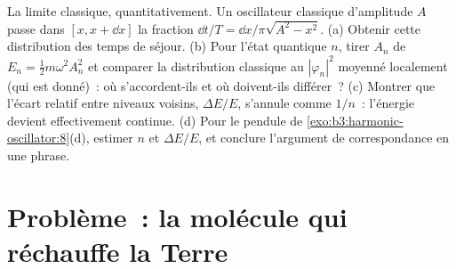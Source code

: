 \begin{exercise}[$\star\star\star$]\label{exo:b3:harmonic-oscillator:12}
La limite classique, quantitativement. Un oscillateur classique
d'amplitude $A$ passe dans $[x, x + \dd x]$ la fraction $\dd
t/T = \dd x/\pi\sqrt{A^2 - x^2}$. (a) Obtenir cette distribution des
temps de séjour. (b) Pour l'état quantique $n$, tirer $A_n$ de $E_n =
\tfrac12 m\omega^2A_n^2$ et comparer la distribution classique au
$|\varphi_n|^2$ moyenné localement (qui est donné)~: où s'accordent-ils
et où doivent-ils différer~? (c) Montrer que l'écart relatif entre
niveaux voisins, $\Delta E/E$, s'annule comme $1/n$~: l'énergie devient
effectivement continue. (d) Pour le pendule de
\cref{exo:b3:harmonic-oscillator:8}(d), estimer $n$ et $\Delta
E/E$, et conclure l'argument de correspondance en une phrase.
\end{exercise}

\section{Problème~: la molécule qui réchauffe la Terre}

